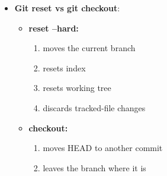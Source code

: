 \documentclass{report}
\begin{document}
\begin{itemize}
\begin{itemize}
                    So your working tree and index are updated to match the snapshot stored in commit 5f1bc85.
                    \bigbreak \noindent 
                    You are not currently “on” a branch.
                    \bigbreak \noindent 
                    You can inspect old files, build the project, run tests, or look around safely.
                    \bigbreak \noindent 
                    But if you make a new commit from here:
                    \bigbreak \noindent 
                    \begin{bashcode}
                        git add .
                        git commit -m "experiment"
                    \end{bashcode}
                    \bigbreak \noindent 
                    you get
                    \bigbreak \noindent 
                    \begin{verbatim}
                        A--B--C--D main 
                        \ 
                        E HEAD
                    \end{verbatim}
                    \bigbreak \noindent 
                    Commit E is not on a named branch unless you create one.
                    \bigbreak \noindent 
                    \begin{bashcode}
                        git switch -c experiment-branch
                    \end{bashcode}
                \item \textbf{Git reset vs git checkout}: 
                    \begin{itemize}
                        \item \textbf{reset --hard:}
                            \begin{enumerate}
                                \item moves the current branch
                                \item resets index
                                \item resets working tree
                                \item discards tracked-file changes
                            \end{enumerate}
                        \item \textbf{checkout:}
                            \begin{enumerate}
                                \item moves HEAD to another commit
                                \item leaves the branch where it is

\end{enumerate}
\end{itemize}
\end{itemize}
\end{itemize}
\end{document}
